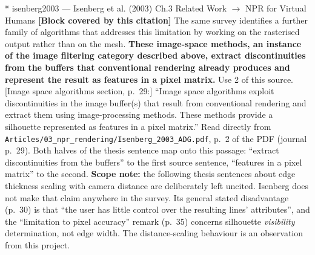 \documentclass[11pt, a4paper]{article}
\makeatletter
\newcounter{citentry}
\newcommand{\citentry@core}[7]{%
  \stepcounter{citentry}
  \begingroup
  \sbox{\citentry@measurebox}{%
    \begin{minipage}{\linewidth}
      \noindent\colorbox{konstanzblue}{\parbox{\dimexpr\linewidth-2\fboxsep}{%
        \vspace{3pt}
        \textbf{\#\thecitentry \quad #2} \hfill \textit{#3}
        \vspace{3pt}
      }}
      \vspace{3pt}
      \noindent\begin{tabular}{@{}p{2.7cm} p{\dimexpr\linewidth-3cm}@{}}
        \textit{\small Sentence in thesis:} & #4 \\[5pt]
        \textbf{Usage:}\hfill       & #5 \\[5pt]
        \textit{\small Original source:}     & #6 \\[5pt]
        \textbf{How to check:}             & #7 \\
      \end{tabular}
      \vspace{5pt}
      \rule{10pt}{10pt}\quad \textbf{Validated} --- I have read the original and agree it supports the sentence.
    \end{minipage}%
  }%
  \Needspace{\dimexpr\ht\citentry@measurebox+\dp\citentry@measurebox\relax}%
  \endgroup
  \vspace{10pt}
  \noindent\colorbox{konstanzblue}{\parbox{\dimexpr\linewidth-2\fboxsep}{%
    \vspace{3pt}
    \textcolor{white}{\textbf{\#\thecitentry \quad #2}} \hfill \textcolor{white}{\textit{#3}}
    \vspace{3pt}
  }}
  \vspace{3pt}
  \noindent\begin{tabular}{@{}p{2.7cm} p{\dimexpr\linewidth-3cm}@{}}
    \textit{\small Sentence in thesis:} & \textcolor{darkgreen}{#4} \\[5pt]
    \textbf{Usage:}\hfill       & #5 \\[5pt]
    \textit{\small Original source:}     & \textcolor{darkred}{#6} \\[5pt]
    \textbf{How to check:}             & #7 \\
  \end{tabular}
  \vspace{5pt}
  \noindent\CheckBox[name=verified\thecitentry, width=10pt, height=10pt, bordercolor={0 0 0}, borderwidth=0.75, backgroundcolor={1 1 1}#1]{}\quad \textbf{Validated} --- I have read the original and agree it supports the sentence.
  \vspace{3pt}
  \noindent\textcolor{midgray}{\rule{\linewidth}{0.4pt}}
}
\newcommand{\citentry}{\@ifstar{\citentry@core{, checked}}{\citentry@core{}}}
\makeatother
\begin{document}
\begin{Form}
\citentry*
  {isenberg2003 --- Isenberg et al. (2003)}
  {Ch.3 Related Work $\rightarrow$ NPR for Virtual Humans}
  {\textbf{[Block covered by this citation]} The same survey identifies a further family of algorithms that addresses this limitation by working on the rasterised output rather than on the mesh. \textbf{These image-space methods, an instance of the image filtering category described above, extract discontinuities from the buffers that conventional rendering already produces and represent the result as features in a pixel matrix.}}
  {Use 2 of this source.}
  {[Image space algorithms section, p.~29:] ``Image space algorithms exploit discontinuities in the image buffer(s) that result from conventional rendering and extract them using image-processing methods. These methods provide a silhouette represented as features in a pixel matrix.''}
  {Read directly from \texttt{\footnotesize Articles/03\_npr\_rendering/Isenberg\_2003\_ADG.pdf}, p.~2 of the PDF (journal p.~29). Both halves of the thesis sentence map onto this passage: ``extract discontinuities from the buffers'' to the first source sentence, ``features in a pixel matrix'' to the second. \textbf{Scope note:} the following thesis sentences about edge thickness scaling with camera distance are deliberately left uncited. Isenberg does not make that claim anywhere in the survey. Its general stated disadvantage (p.~30) is that ``the user has little control over the resulting lines' attributes'', and the ``limitation to pixel accuracy'' remark (p.~35) concerns silhouette \emph{visibility} determination, not edge width. The distance-scaling behaviour is an observation from this project.}


\end{Form}
\end{document}
